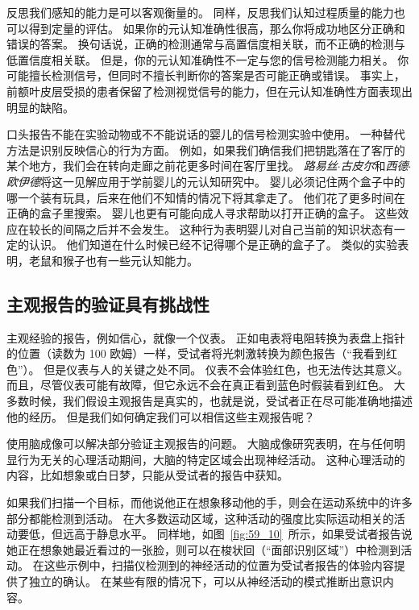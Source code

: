 反思我们感知的能力是可以客观衡量的。
同样，反思我们认知过程质量的能力也可以得到定量的评估。
如果你的元认知准确性很高，那么你将成功地区分正确和错误的答案。
换句话说，正确的检测通常与高置信度相关联，而不正确的检测与低置信度相关联。
但是，你的元认知准确性不一定与您的信号检测能力相关。
你可能擅长检测信号，但同时不擅长判断你的答案是否可能正确或错误。
事实上，前额叶皮层受损的患者保留了检测视觉信号的能力，但在元认知准确性方面表现出明显的缺陷。


口头报告不能在实验动物或不不能说话的婴儿的信号检测实验中使用。
一种替代方法是识别反映信心的行为方面。
例如，如果我们确信我们把钥匙落在了客厅的某个地方，我们会在转向走廊之前花更多时间在客厅里找。
\textit{路易丝$\cdot$古皮尔}和\textit{西德$\cdot$欧伊德}将这一见解应用于学前婴儿的元认知研究中。
婴儿必须记住两个盒子中的哪一个装有玩具，后来在他们不知情的情况下将其拿走了。
他们花了更多时间在正确的盒子里搜索。
婴儿也更有可能向成人寻求帮助以打开正确的盒子。
这些效应在较长的间隔之后并不会发生。
这种行为表明婴儿对自己当前的知识状态有一定的认识。
他们知道在什么时候已经不记得哪个是正确的盒子了。
类似的实验表明，老鼠和猴子也有一些元认知能力。



\subsection{主观报告的验证具有挑战性}

主观经验的报告，例如信心，就像一个仪表。
正如电表将电阻转换为表盘上指针的位置（读数为 100 欧姆）一样，受试者将光刺激转换为颜色报告（“我看到红色”）。
但是仪表与人的关键之处不同。
仪表不会体验红色，也无法传达其意义。
而且，尽管仪表可能有故障，但它永远不会在真正看到蓝色时假装看到红色。
大多数时候，我们假设主观报告是真实的，也就是说，受试者正在尽可能准确地描述他的经历。
但是我们如何确定我们可以相信这些主观报告呢？


使用脑成像可以解决部分验证主观报告的问题。
大脑成像研究表明，在与任何明显行为无关的心理活动期间，大脑的特定区域会出现神经活动。
这种心理活动的内容，比如想象或白日梦，只能从受试者的报告中获知。


如果我们扫描一个目标，而他说他正在想象移动他的手，则会在运动系统中的许多部分都能检测到活动。
在大多数运动区域，这种活动的强度比实际运动相关的活动要低，但远高于静息水平。
同样地，如图~\ref{fig:59_10}~所示，如果受试者报告说她正在想象她最近看过的一张脸，则可以在梭状回（“面部识别区域”）中检测到活动。
在这些示例中，扫描仪检测到的神经活动的位置为受试者报告的体验内容提供了独立的确认。
在某些有限的情况下，可以从神经活动的模式推断出意识内容。


